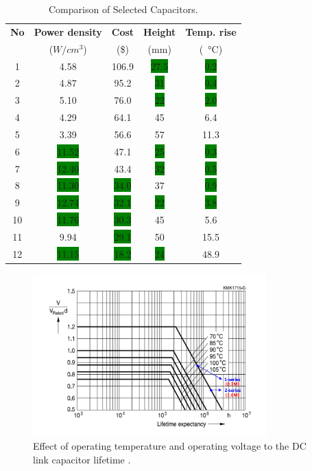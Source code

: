 \documentclass[conference,a4paper,twocolumn]{IEEEtran}
\begin{document}
\begin{table}[h]
\renewcommand{\arraystretch}{1.4}
\caption{Comparison of Selected Capacitors.}
\label{table4}
\centering
\begin{tabular}{ccccc}
\hline
\textbf{No} & \textbf{Power density} & \textbf{Cost} & \textbf{Height} & \textbf{Temp. rise}\\
& ($W/cm^3$) & (\$) & (mm) &  (\SI{}{\celsius}) \\
\hline
1 & 4.58 & 106.9 & \colorbox{green}{27.5} & \colorbox{green}{0.2}\\
\hline
2 & 4.87 & 95.2 & \colorbox{green}{31} & \colorbox{green}{0.4}\\
\hline
3 & 5.10 & 76.0 & \colorbox{green}{22} & \colorbox{green}{2.0}\\
\hline
4 & 4.29 & 64.1 & 45 & 6.4\\
\hline
5 & 3.39 & 56.6 & 57 & 11.3\\
\hline
6 & \colorbox{green}{11.52} & 47.1 & \colorbox{green}{25} & \colorbox{green}{0.3}\\
\hline
7 & \colorbox{green}{12.40} & 43.4 & \colorbox{green}{32} & \colorbox{green}{0.5}\\
\hline
8 & \colorbox{green}{11.30} & \colorbox{green}{34.0} & 37 & \colorbox{green}{0.9}\\
\hline
9 & \colorbox{green}{12.74} & \colorbox{green}{32.1} & \colorbox{green}{22} & \colorbox{green}{3.8}\\
\hline
10 & \colorbox{green}{11.76} & \colorbox{green}{30.3} & 45 & 5.6\\
\hline
11 & 9.94 & \colorbox{green}{29.1} & 50 & 15.5\\
\hline
12 & \colorbox{green}{11.15} & \colorbox{green}{18.2} & \colorbox{green}{24} & 48.9\\
\hline
\end{tabular}
\end{table}


\begin{figure}[h]
  \centering
  \includegraphics[width=9cm]{lifetime}
  \caption{Effect of operating temperature and operating voltage to the DC link capacitor lifetime \cite{Polypropylene2009}.}
  \label{lifetime}
\end{figure}
\end{document}
